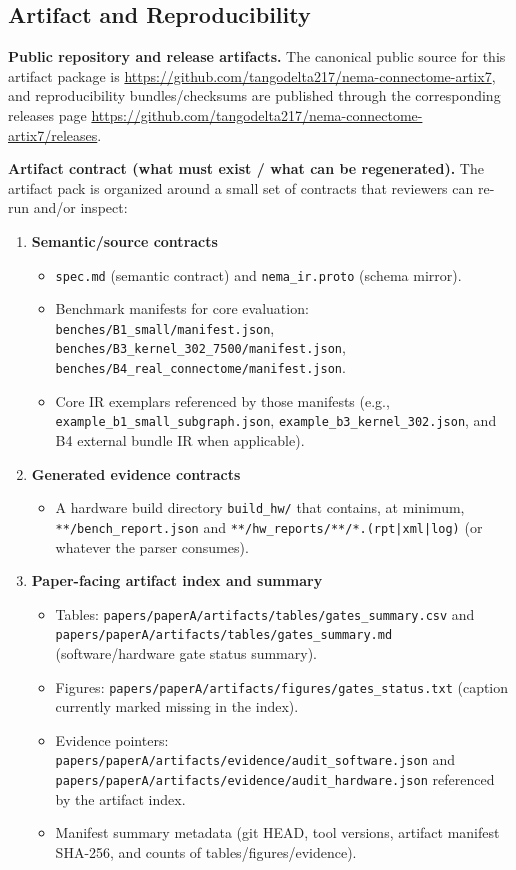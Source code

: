 \subsection{Artifact and Reproducibility}

\textbf{Public repository and release artifacts.}
The canonical public source for this artifact package is \url{https://github.com/tangodelta217/nema-connectome-artix7}, and reproducibility bundles/checksums are published through the corresponding releases page \url{https://github.com/tangodelta217/nema-connectome-artix7/releases}.

\textbf{Artifact contract (what must exist / what can be regenerated).}
The artifact pack is organized around a small set of contracts that reviewers can re-run and/or inspect:
\begin{enumerate}
\item \textbf{Semantic/source contracts}
\begin{itemize}
\item \texttt{spec.md} (semantic contract) and \texttt{nema\_ir.proto} (schema mirror).
\item Benchmark manifests for core evaluation: \texttt{benches/B1\_small/manifest.json}, \texttt{benches/B3\_kernel\_302\_7500/manifest.json}, \texttt{benches/B4\_real\_connectome/manifest.json}.
\item Core IR exemplars referenced by those manifests (e.g., \texttt{example\_b1\_small\_subgraph.json}, \texttt{example\_b3\_kernel\_302.json}, and B4 external bundle IR when applicable).
\end{itemize}
\item \textbf{Generated evidence contracts}
\begin{itemize}
\item A hardware build directory \texttt{build\_hw/} that contains, at minimum, \texttt{**/bench\_report.json} and \texttt{**/hw\_reports/**/*.(rpt|xml|log)} (or whatever the parser consumes).
\end{itemize}
\item \textbf{Paper-facing artifact index and summary}
\begin{itemize}
\item Tables: \texttt{papers/paperA/artifacts/tables/gates\_summary.csv} and \texttt{papers/paperA/artifacts/tables/gates\_summary.md} (software/hardware gate status summary).
\item Figures: \texttt{papers/paperA/artifacts/figures/gates\_status.txt} (caption currently marked missing in the index).
\item Evidence pointers: \texttt{papers/paperA/artifacts/evidence/audit\_software.json} and \texttt{papers/paperA/artifacts/evidence/audit\_hardware.json} referenced by the artifact index.
\item Manifest summary metadata (git HEAD, tool versions, artifact manifest SHA-256, and counts of tables/figures/evidence).
\end{itemize}
\end{enumerate}


